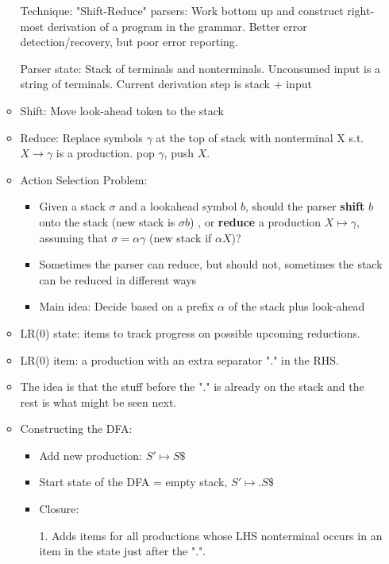 \begin{itemize}
\begin{itemize}
		Technique: "Shift-Reduce" parsers: Work bottom up and construct right-most derivation of a program in the grammar. Better error detection/recovery, but poor error reporting.
		
		Parser state: Stack of terminals and nonterminals. Unconsumed input is a string of terminals. Current derivation step is stack + input
		
		\item Shift: Move look-ahead token to the stack
		
		\item Reduce: Replace symbols $\gamma$ at the top of stack with nonterminal X s.t.  $X \rightarrow \gamma$ is a production. pop $\gamma$, push $X$. 
			
		\item Action Selection Problem:
		\begin{itemize}
			\item Given a stack $\sigma$ and a lookahead symbol $b$, should the parser \textbf{shift} $b$ onto the stack (new stack is $\sigma b$) , or \textbf{reduce} a production $X \mapsto \gamma$, assuming that $\sigma = \alpha \gamma$ (new stack if $\alpha X$)?
			\item Sometimes the parser can reduce, but should not, sometimes the stack can be reduced in different ways
			\item Main idea: Decide based on a prefix $\alpha$ of the stack plus look-ahead
		\end{itemize}
		
		\item LR(0) state: items to track progress on possible upcoming reductions.
		
		\item LR(0) item: a production with an extra separator "." in the RHS.
		
		\item The idea is that the stuff before the "." is already on the stack and the rest is what might be seen next. 
		
		\item Constructing the DFA:
		\begin{itemize}
			\item Add new production: $S' \mapsto S\$$
			
			\item Start state of the DFA = empty stack, $S' \mapsto .S\$$
			
			\item Closure:
			
			1. Adds items for all productions whose LHS nonterminal occurs in an item in the state just after the ".".
			

\end{itemize}
\end{itemize}
\end{itemize}
